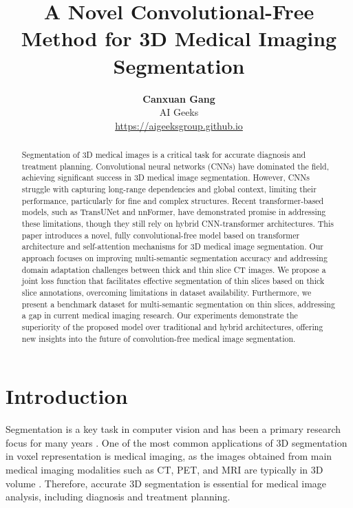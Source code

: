 \documentclass{article}
\title{\textbf{A Novel Convolutional-Free Method for 3D Medical Imaging Segmentation}}
\author{\textbf{Canxuan Gang} \\AI Geeks\\\url{https://aigeeksgroup.github.io}}
\date{}
\begin{document}
\setlength{\parindent}{0pt}
\setlength{\parskip}{10pt}

\maketitle


\begin{abstract}
    Segmentation of 3D medical images is a critical task for accurate diagnosis and treatment planning. Convolutional neural networks (CNNs) have dominated the field, achieving significant success in 3D medical image segmentation. However, CNNs struggle with capturing long-range dependencies and global context, limiting their performance, particularly for fine and complex structures. Recent transformer-based models, such as TransUNet and nnFormer, have demonstrated promise in addressing these limitations, though they still rely on hybrid CNN-transformer architectures. This paper introduces a novel, fully convolutional-free model based on transformer architecture and self-attention mechanisms for 3D medical image segmentation. Our approach focuses on improving multi-semantic segmentation accuracy and addressing domain adaptation challenges between thick and thin slice CT images. We propose a joint loss function that facilitates effective segmentation of thin slices based on thick slice annotations, overcoming limitations in dataset availability. Furthermore, we present a benchmark dataset for multi-semantic segmentation on thin slices, addressing a gap in current medical imaging research. Our experiments demonstrate the superiority of the proposed model over traditional and hybrid architectures, offering new insights into the future of convolution-free medical image segmentation.
\end{abstract}

\section{Introduction}

Segmentation is a key task in computer vision and has been a primary research focus for many years \cite{1}. One of the most common applications of 3D segmentation in voxel representation is medical imaging, as the images obtained from main medical imaging modalities such as CT, PET, and MRI are typically in 3D volume \cite{2,wu2023bhsd,zhang2024segreg,tan2024segstitch}. Therefore, accurate 3D segmentation is essential for medical image analysis, including diagnosis and treatment planning. 
\end{document}
